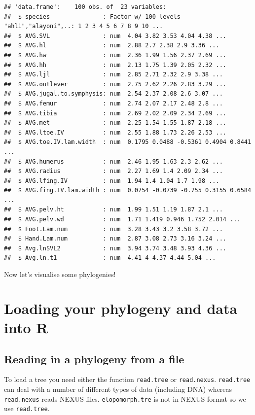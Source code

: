 \documentclass[]{book}
\theoremstyle{definition}
\theoremstyle{definition}
\theoremstyle{definition}
\theoremstyle{remark}
\begin{document}
\begin{verbatim}
## 'data.frame':    100 obs. of  23 variables:
##  $ species               : Factor w/ 100 levels "ahli","alayoni",..: 1 2 3 4 5 6 7 8 9 10 ...
##  $ AVG.SVL               : num  4.04 3.82 3.53 4.04 4.38 ...
##  $ AVG.hl                : num  2.88 2.7 2.38 2.9 3.36 ...
##  $ AVG.hw                : num  2.36 1.99 1.56 2.37 2.69 ...
##  $ AVG.hh                : num  2.13 1.75 1.39 2.05 2.32 ...
##  $ AVG.ljl               : num  2.85 2.71 2.32 2.9 3.38 ...
##  $ AVG.outlever          : num  2.75 2.62 2.26 2.83 3.29 ...
##  $ AVG.jugal.to.symphysis: num  2.54 2.37 2.08 2.6 3.07 ...
##  $ AVG.femur             : num  2.74 2.07 2.17 2.48 2.8 ...
##  $ AVG.tibia             : num  2.69 2.02 2.09 2.34 2.69 ...
##  $ AVG.met               : num  2.25 1.54 1.55 1.87 2.18 ...
##  $ AVG.ltoe.IV           : num  2.55 1.88 1.73 2.26 2.53 ...
##  $ AVG.toe.IV.lam.width  : num  0.1795 0.0488 -0.5361 0.4904 0.8441 ...
##  $ AVG.humerus           : num  2.46 1.95 1.63 2.3 2.62 ...
##  $ AVG.radius            : num  2.27 1.69 1.4 2.09 2.34 ...
##  $ AVG.lfing.IV          : num  1.94 1.4 1.04 1.7 1.98 ...
##  $ AVG.fing.IV.lam.width : num  0.0754 -0.0739 -0.755 0.3155 0.6584 ...
##  $ AVG.pelv.ht           : num  1.99 1.51 1.19 1.87 2.1 ...
##  $ AVG.pelv.wd           : num  1.71 1.419 0.946 1.752 2.014 ...
##  $ Foot.Lam.num          : num  3.28 3.43 3.2 3.58 3.72 ...
##  $ Hand.Lam.num          : num  2.87 3.08 2.73 3.16 3.24 ...
##  $ Avg.lnSVL2            : num  3.94 3.74 3.48 3.93 4.36 ...
##  $ Avg.ln.t1             : num  4.41 4 4.37 4.44 5.04 ...
\end{verbatim}

Now let's visualise some phylogenies!

\section{Loading your phylogeny and data into
R}\label{loading-your-phylogeny-and-data-into-r}

\subsection{Reading in a phylogeny from a
file}\label{reading-in-a-phylogeny-from-a-file}

To load a tree you need either the function \texttt{read.tree} or
\texttt{read.nexus}. \texttt{read.tree} can deal with a number of
different types of data (including DNA) whereas \texttt{read.nexus}
reads NEXUS files. \texttt{elopomorph.tre} is not in NEXUS format so we
use \texttt{read.tree}.
\end{document}
